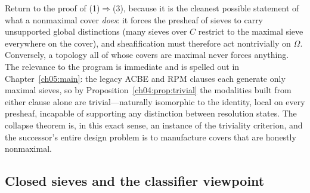\begin{remark}\label{ch04:rem:trivialreading}
Return to the proof of (1)$\Rightarrow$(3), because it is the
cleanest possible statement of what a nonmaximal cover \emph{does}: it forces
the presheaf of sieves to carry unsupported global distinctions (many sieves
over $C$ restrict to the maximal sieve everywhere on the cover), and
sheafification must therefore act nontrivially on $\Omega$. Conversely, a
topology all of whose covers are maximal never forces anything. The relevance
to the program is immediate and is spelled out in
Chapter~\ref{ch05:main}: the legacy ACBE and RPM clauses each generate only
maximal sieves, so by Proposition~\ref{ch04:prop:trivial} the modalities
built from either clause alone are trivial---naturally isomorphic to the
identity, local on every presheaf, incapable of supporting any distinction
between resolution states. The collapse theorem is, in this exact sense, an
instance of the triviality criterion, and the successor's entire design
problem is to manufacture covers that are honestly nonmaximal.
\end{remark}

\subsection{Closed sieves and the classifier viewpoint}\label{ch04:sub:closed}

